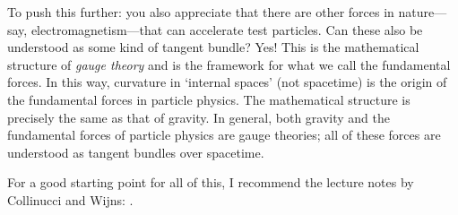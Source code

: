 \documentclass[12pt, oneside]{report}    %
\begin{document}
\begin{example}
To push this further: you also appreciate that there are other forces in nature---say, electromagnetism---that can accelerate test particles. Can these also be understood as some kind of tangent bundle? Yes! This is the mathematical structure of \emph{gauge theory} and is the framework for what we call the fundamental forces. In this way, curvature in `internal spaces' (not spacetime) is the origin of the fundamental forces in particle physics. The mathematical structure is precisely the same as that of gravity. In general, both gravity and the fundamental forces of particle physics are gauge theories; all of these forces are understood as tangent bundles over spacetime. 

For a good starting point for all of this, I recommend the lecture notes by Collinucci and Wijns: \cite{Collinucci:2006hx}.
\end{example}
\end{document}
